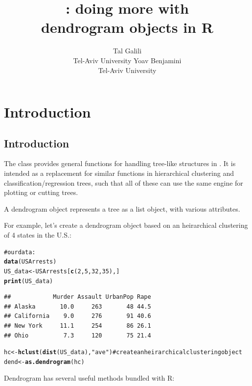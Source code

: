 \documentclass[shortnames,nojss,article]{jss}\usepackage{graphicx, color}
\author{Tal Galili\\Tel-Aviv University \And Yoav Benjamini\\Tel-Aviv University}
\title{\pkg{dendextend}: doing more with\\ dendrogram objects in R}
\makeatletter
\newcommand{\hlfunctioncall}[1]{\textcolor[rgb]{0.501960784313725,0,0.329411764705882}{\textbf{#1}}}%
\newcommand{\hlstring}[1]{\textcolor[rgb]{0.6,0.6,1}{#1}}%
\newcommand{\hlcomment}[1]{\textcolor[rgb]{0.180392156862745,0.6,0.341176470588235}{#1}}%
\newenvironment{kframe}{%
 \def\at@end@of@kframe{}%
 \ifinner\ifhmode%
  \def\at@end@of@kframe{\end{minipage}}%
  \begin{minipage}{\columnwidth}%
 \fi\fi%
 \def\FrameCommand##1{\hskip\@totalleftmargin \hskip-\fboxsep
 \colorbox{shadecolor}{##1}\hskip-\fboxsep
     \hskip-\linewidth \hskip-\@totalleftmargin \hskip\columnwidth}%
 \MakeFramed {\advance\hsize-\width
   \@totalleftmargin\z@ \linewidth\hsize
   \@setminipage}}%
 {\par\unskip\endMakeFramed%
 \at@end@of@kframe}
\newenvironment{knitrout}{}{} %
\makeatother
\begin{document}
\vspace*{-0.25cm}

\section{Introduction}

\subsection{Introduction}


The  class provides general functions for handling tree-like structures in  \citep{R:Main}. It is intended as a replacement for similar functions in hierarchical clustering and classification/regression trees, such that all of these can use the same engine for plotting or cutting trees.

A dendrogram object represents a tree as a list object, with various attributes.

For example, let's create a dendrogram object based on an heirarchical clustering of 4 states in the U.S.:

\begin{knitrout}
\color{fgcolor}\begin{kframe}
\begin{alltt}
\hlcomment{# our data:}
\hlfunctioncall{data}(USArrests)
US_data <- USArrests[\hlfunctioncall{c}(2, 5, 32, 35), ]
\hlfunctioncall{print}(US_data)
\end{alltt}
\begin{verbatim}
##            Murder Assault UrbanPop Rape
## Alaska       10.0     263       48 44.5
## California    9.0     276       91 40.6
## New York     11.1     254       86 26.1
## Ohio          7.3     120       75 21.4
\end{verbatim}
\begin{alltt}

hc <- \hlfunctioncall{hclust}(\hlfunctioncall{dist}(US_data), \hlstring{"ave"})  # create an heirarchical clustering object
dend <- \hlfunctioncall{as.dendrogram}(hc)
\end{alltt}
\end{kframe}
\end{knitrout}




Dendrogram has several useful methods bundled with R:
\end{document}
